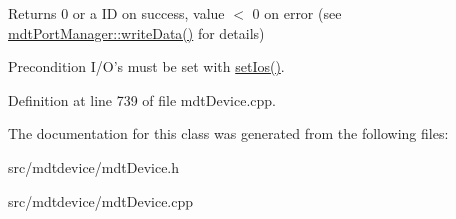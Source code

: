 \begin{DoxyReturn}{Returns}
0 or a ID on success, value $<$ 0 on error (see \hyperlink{classmdt_port_manager_a8b60d53d6e553f15dedec916f9c1614b}{mdtPortManager::writeData()} for details) 
\end{DoxyReturn}
\begin{DoxyPrecond}{Precondition}
I/O's must be set with \hyperlink{classmdt_device_a9f1de62ef54974b0636dee673bd819e2}{setIos()}. 
\end{DoxyPrecond}


Definition at line 739 of file mdtDevice.cpp.



The documentation for this class was generated from the following files:\begin{DoxyCompactItemize}
\item 
src/mdtdevice/mdtDevice.h\item 
src/mdtdevice/mdtDevice.cpp\end{DoxyCompactItemize}
